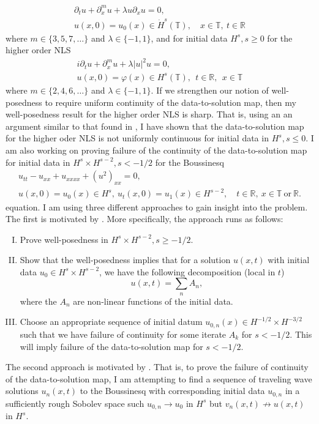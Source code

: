 \documentclass[12pt,reqno]{amsart}
\newcommand{\rr}{\mathbb{R}}
\newcommand{\ci}{\mathbb{T}}
\newcommand{\p}{\partial}
\newcommand{\vp}{\varphi}
\begin{document}
\begin{gather}
	\label{mmKDV-eq}
	\p_t u + \p_x^{m} u + \lambda u \p_x u = 0,
	\\
	\label{mmKDV-init-data}
  u(x,0) = u_0(x) \in \dot{H}^{s}(\ci), \quad x \in \ci, \ t \in \rr
\end{gather}
%
%
where $m \in \{3, 5, 7,\dots \}$ and $\lambda \in \{-1, 1\}$, 
%
and for initial data $H^{s}, s \ge 0$ for the higher order NLS
%
%
\begin{gather}
	\label{nmNLS-eq}
	i \p_t u + \p_x^{m} u + \lambda |u|^2 u =0,
		\\
		\label{nmNLS-init-data}
		u(x,0) = \vp(x) \in H^s(\ci), \ \ t \in \rr, \ \ x \in \ci
\end{gather}
%
%
where $m \in \{2,4,6,\dots\}$ and $\lambda \in \{-1, 1\}$. If we strengthen our
notion of well-posedness to require uniform continuity of the data-to-solution
map, then my well-posedness result for the higher order NLS is sharp. That is,
using an an argument
similar to that found in \cite{Burq_Gerad_Tzvetkov-An-instability-}, I have
shown that the data-to-solution map for the higher oder NLS is not uniformly
continuous for initial data in $H^{s}, s \le 0$. 
%
%
%
I am also working on proving failure of the continuity of the data-to-solution map for
initial data in $H^{s} \times H^{s-2}, s < -1/2$ for the Boussinesq 
\begin{gather}
   u_{tt} - u_{xx} + u_{xxxx} + (u^{2})_{xx} = 0,
  \\
   u(x,0) = u_{0}(x) \in H^{s}, \  u_{t}(x,0) = u_{1}(x) \in H^{s-2},
  \quad t \in \rr, \ x \in \ci \ \text{or} \ \rr.
\end{gather} 
equation. I am using three
different approaches to gain insight into the problem. The first is motivated by
\cite{Bejenaru-Tao-2006-Sharp-well-posedness-and-ill-posedness}. More
specifically, the approach runs as follows:
\begin{enumerate}[I.]
  \item
    Prove well-posedness in $H^{s} \times H^{s-2}, s \ge -1/2$.
 \item
   Show that the well-posedness implies that for a solution $u(x,t)$ with
   initial data $u_{0} \in H^{s} \times H^{s-2}$, we have the following
   decomposition (local in $t$) 
   $$u(x,t) = \sum_{n} A_{n},$$ where the $A_{n}$ are non-linear functions of
   the initial data. 
 \item 
   Choose an appropriate sequence of initial datum $u_{0,n}(x) \in H^{-1/2}
   \times H^{-3/2}$ such that
   we have failure of continuity for some iterate $A_{k}$ for $s < -1/2$.
   This will imply
   failure of the data-to-solution map for $s < -1/2$.
   \end{enumerate}
%
The second approach is motivated by \cite{Himonas:2005kx}. That is,
to prove the failure of continuity of the data-to-solution map, I am attempting
to find a sequence of traveling wave solutions $u_{n}(x,t)$ to the Boussinesq with
corresponding initial data $u_{0,n}$ in a sufficiently rough Sobolev space such 
$u_{0,n} \to u_{0}$ in $H^{s}$ but $v_{n}(x,t) \not \to u(x,t)$ in $H^{s}$. 
\end{document}
